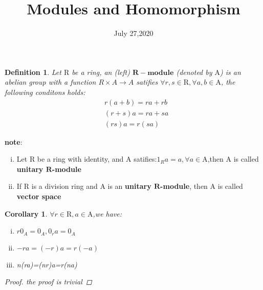 \documentclass[a4paper]{article}
\title{Modules and Homomorphism}
\date{July 27,2020}
\newtheorem{myDef}{Definition}
\newtheorem{myCol}{Corollary}
\begin{document}
    \maketitle
    \begin{myDef}
        Let $\mathrm{R}$ be a ring, an (left) $\mathbf{R-module}$ (denoted by $\mathrm{A}$) is an abelian group
        with a function $R\times A\rightarrow A$ satifies $\forall r,s \in \mathrm{R}, \forall a,b\in \mathrm{A}$,
        the following conditons holds:
        $$
        \begin{aligned}
        &r(a+b)=ra+rb\\
        &(r+s)a=ra+sa\\
        &(rs)a =r(sa)
        \end{aligned}
        $$
    \end{myDef}
    \noindent
    \textbf{note}:
    \begin{enumerate}[(i)]
        \item Let $\mathrm{R}$ be a ring with identity, and $\mathrm{A}$ satifies:$1_Ra=a, \forall a\in \mathrm{A}$,then $\mathrm{A}$ is called \textbf{unitary $\mathbf{R}$-module}
        \item If $\mathrm{R}$ is a division ring and $\mathrm{A}$ is an \textbf{unitary $\mathbf{R}$-module}, then $\mathrm{A}$ is called \textbf{vector space}\\
    \end{enumerate}
    
    \begin{myCol}
        $\forall r \in \mathrm{R},a\in\mathrm{A}$,we have:
        \begin{enumerate}[(i)]
            \item $r0_A = 0_A,0_ra=0_A$
            \item $-ra=(-r)a=r(-a)$
            \item n(ra)=(nr)a=r(na)
        \end{enumerate}
        \vspace{0.1cm}
        \begin{proof}
            the proof is trivial
        \end{proof}
        \vspace{0.3cm}
    \end{myCol}
    
\end{document}
